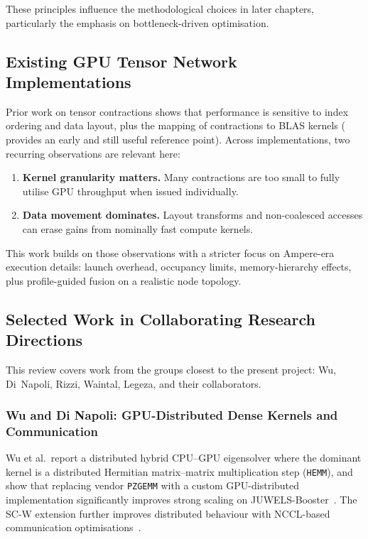These principles influence the methodological choices in later chapters,
particularly the emphasis on bottleneck-driven optimisation.

\subsection{Existing GPU Tensor Network Implementations}\label{sec:existing-tn-gpu}

Prior work on tensor contractions shows that performance is sensitive to index
ordering and data layout, plus the mapping of contractions to BLAS kernels
(\cite{springer2017tensor} provides an early and still useful reference point).
Across implementations, two recurring observations are relevant here:

\begin{enumerate}
  \item \textbf{Kernel granularity matters.} Many contractions are too small to
    fully utilise GPU throughput when issued individually.
  \item \textbf{Data movement dominates.} Layout transforms and non-coalesced
    accesses can erase gains from nominally fast compute kernels.
\end{enumerate}

This work builds on those observations with a stricter focus on Ampere-era
execution details: launch overhead, occupancy limits, memory-hierarchy effects,
plus profile-guided fusion on a realistic node topology.

\subsection{Selected Work in Collaborating Research Directions}\label{sec:people-sota}

This review covers work from the groups closest to the present project:
Wu, Di~Napoli, Rizzi, Waintal, Legeza, and their collaborators.

\subsubsection{Wu and Di Napoli: GPU-Distributed Dense Kernels and Communication}

Wu et al.\ report a distributed hybrid CPU--GPU eigensolver where the dominant
kernel is a distributed Hermitian matrix--matrix multiplication step
(\texttt{HEMM}), and show that replacing vendor \texttt{PZGEMM} with a custom
GPU-distributed implementation significantly improves strong scaling on
JUWELS-Booster~\cite{wu2022chase-gpu}. The SC-W extension further improves
distributed behaviour with NCCL-based communication
optimisations~\cite{wu2023chase-nccl}.

